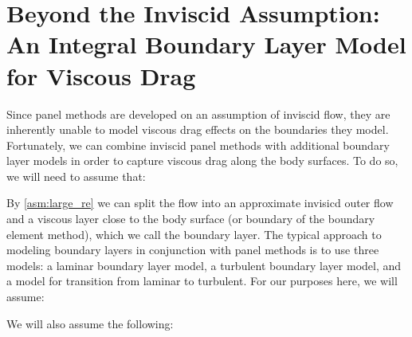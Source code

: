 \section{Beyond the Inviscid Assumption: An Integral Boundary Layer Model for Viscous Drag}

Since panel methods are developed on an assumption of inviscid flow, they are inherently unable to model viscous drag effects on the boundaries they model.
Fortunately, we can combine inviscid panel methods with additional boundary layer models in order to capture viscous drag along the body surfaces.
To do so, we will need to assume that:

\begin{assumption}{}
    \label{asm:large_re}




\end{assumption}

\noindent By \cref{asm:large_re} we can split the flow into an approximate invisicd outer flow and a viscous layer close to the body surface (or boundary of the boundary element method), which we call the boundary layer.
The typical approach to modeling boundary layers in conjunction with panel methods is to use three models: a laminar boundary layer model, a turbulent boundary layer model, and a model for transition from laminar to turbulent.
For our purposes here, we will assume:

\begin{assumption}{}



\end{assumption}

\noindent We will also assume the following:


